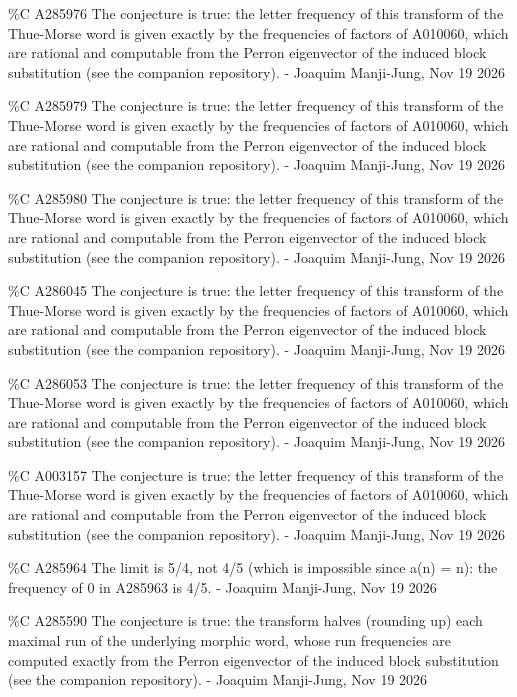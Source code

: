 {\%C A285976 The conjecture is true: the letter frequency of this transform of the Thue-Morse word is given exactly by the frequencies of factors of A010060, which are rational and computable from the Perron eigenvector of the induced block substitution (see the companion repository). - Joaquim Manji-Jung, Nov 19 2026\par
\%C A285979 The conjecture is true: the letter frequency of this transform of the Thue-Morse word is given exactly by the frequencies of factors of A010060, which are rational and computable from the Perron eigenvector of the induced block substitution (see the companion repository). - Joaquim Manji-Jung, Nov 19 2026\par
\%C A285980 The conjecture is true: the letter frequency of this transform of the Thue-Morse word is given exactly by the frequencies of factors of A010060, which are rational and computable from the Perron eigenvector of the induced block substitution (see the companion repository). - Joaquim Manji-Jung, Nov 19 2026\par
\%C A286045 The conjecture is true: the letter frequency of this transform of the Thue-Morse word is given exactly by the frequencies of factors of A010060, which are rational and computable from the Perron eigenvector of the induced block substitution (see the companion repository). - Joaquim Manji-Jung, Nov 19 2026\par
\%C A286053 The conjecture is true: the letter frequency of this transform of the Thue-Morse word is given exactly by the frequencies of factors of A010060, which are rational and computable from the Perron eigenvector of the induced block substitution (see the companion repository). - Joaquim Manji-Jung, Nov 19 2026\par
\%C A003157 The conjecture is true: the letter frequency of this transform of the Thue-Morse word is given exactly by the frequencies of factors of A010060, which are rational and computable from the Perron eigenvector of the induced block substitution (see the companion repository). - Joaquim Manji-Jung, Nov 19 2026\par
\%C A285964 The limit is 5/4, not 4/5 (which is impossible since a(n) = n): the frequency of 0 in A285963 is 4/5. - Joaquim Manji-Jung, Nov 19 2026\par
\%C A285590 The conjecture is true: the transform halves (rounding up) each maximal run of the underlying morphic word, whose run frequencies are computed exactly from the Perron eigenvector of the induced block substitution (see the companion repository). - Joaquim Manji-Jung, Nov 19 2026\par
}
